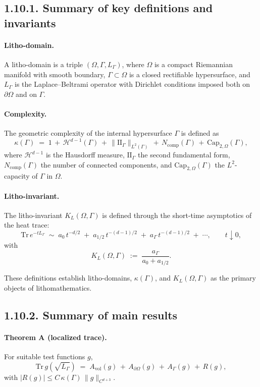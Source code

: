 \subsection*{1.10.1. Summary of key definitions and invariants}

\paragraph{Litho-domain.}
A litho-domain is a triple $(\Omega,\Gamma,L_\Gamma)$,
where $\Omega$ is a compact Riemannian manifold with smooth boundary,
$\Gamma\subset\Omega$ is a closed rectifiable hypersurface,
and $L_\Gamma$ is the Laplace–Beltrami operator
with Dirichlet conditions imposed both on $\partial\Omega$
and on $\Gamma$.

\paragraph{Complexity.}
The geometric complexity of the internal hypersurface $\Gamma$
is defined as
\[
\kappa(\Gamma) \;=\; 1 \,+\, \mathcal{H}^{d-1}(\Gamma) \,+\, \| \mathrm{II}_\Gamma \|_{L^2(\Gamma)} \,+\, N_{\mathrm{comp}}(\Gamma) \,+\, \mathrm{Cap}_{2,\Omega}(\Gamma),
\]
where $\mathcal{H}^{d-1}$ is the Hausdorff measure,
$\mathrm{II}_\Gamma$ the second fundamental form,
$N_{\mathrm{comp}}(\Gamma)$ the number of connected components,
and $\mathrm{Cap}_{2,\Omega}(\Gamma)$ the $L^2$-capacity of $\Gamma$ in $\Omega$.

\paragraph{Litho-invariant.}
The litho-invariant $K_L(\Omega,\Gamma)$ is defined
through the short-time asymptotics of the heat trace:
\[
\mathrm{Tr}\,e^{-tL_\Gamma} \;\sim\; a_0\,t^{-d/2} \;+\; a_{1/2}\,t^{-(d-1)/2}
\;+\; a_\Gamma\,t^{-(d-1)/2} \;+\; \cdots,
\qquad t\downarrow 0,
\]
with
\[
K_L(\Omega,\Gamma) \;:=\; \frac{a_\Gamma}{a_0+a_{1/2}}.
\]

These definitions establish litho-domains, $\kappa(\Gamma)$,
and $K_L(\Omega,\Gamma)$ as the primary objects of lithomathematics.

\subsection*{1.10.2. Summary of main results}

\paragraph{Theorem A (localized trace).}
For suitable test functions $g$,
\[
\mathrm{Tr}\,g(\sqrt{L_\Gamma}) \;=\; A_{\mathrm{vol}}(g) \,+\, A_{\partial\Omega}(g) \,+\, A_\Gamma(g) \,+\, R(g),
\]
with $|R(g)|\le C\,\kappa(\Gamma)\,\|g\|_{C^{d+3}}$.

